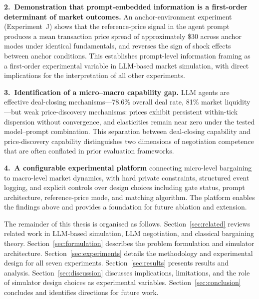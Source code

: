 \textbf{2.\ Demonstration that prompt-embedded information is a first-order
determinant of market outcomes.}  An anchor-environment experiment
(Experiment~J) shows that the reference-price signal in the agent prompt
produces a mean transaction price spread of approximately \$30 across anchor
modes under identical fundamentals, and reverses the sign of shock effects
between anchor conditions.  This establishes prompt-level information
framing as a first-order experimental variable in LLM-based market
simulation, with direct implications for the interpretation of all other
experiments.

\textbf{3.\ Identification of a micro--macro capability gap.}  LLM agents
are effective deal-closing mechanisms---78.6\% overall deal rate, 81\%
market liquidity---but weak price-discovery mechanisms: prices exhibit
persistent within-tick dispersion without convergence, and elasticities
remain near zero under the tested model--prompt combination.  This
separation between deal-closing capability and price-discovery capability
distinguishes two dimensions of negotiation competence that are often
conflated in prior evaluation frameworks.

\textbf{4.\ A configurable experimental platform} connecting micro-level
bargaining to macro-level market dynamics, with hard private constraints,
structured event logging, and explicit controls over design choices including
gate status, prompt architecture, reference-price mode, and matching
algorithm.  The platform enables the findings above and provides a
foundation for future ablation and extension.

The remainder of this thesis is organised as follows.
Section~\ref{sec:related} reviews related work in LLM-based simulation, LLM
negotiation, and classical bargaining theory.
Section~\ref{sec:formulation} describes the problem formulation and simulator
architecture.
Section~\ref{sec:experiments} details the methodology and experimental design
for all seven experiments.
Section~\ref{sec:results} presents results and analysis.
Section~\ref{sec:discussion} discusses implications, limitations, and the
role of simulator design choices as experimental variables.
Section~\ref{sec:conclusion} concludes and identifies directions for future
work.
